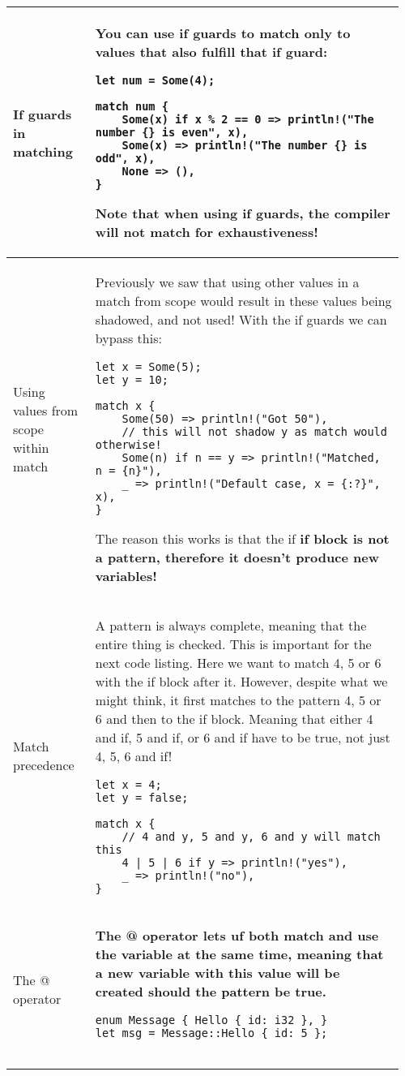 \documentclass[main.tex,fontsize=8pt,paper=a4,paper=portrait,DIV=calc,]{scrartcl}
\begin{document}
\begin{table}[ht!]
\begin{tabular}{|m{0.2\linewidth}|m{0.755\linewidth}|}
\hline
If guards in matching & 
You can use if guards to match only to values that also fulfill that if guard:\newline
\begin{lstlisting}
let num = Some(4);

match num {
    Some(x) if x % 2 == 0 => println!("The number {} is even", x),
    Some(x) => println!("The number {} is odd", x),
    None => (),
}
\end{lstlisting} 
\textcolor{OliveGreen}{Note that when using if guards, the compiler will not match for exhaustiveness!}\\
\hline
Using values from scope within match & 
Previously we saw that using other values in a match from scope would result in these values being shadowed, and not used!\newline
With the if guards we can bypass this:\newline
\begin{lstlisting}
let x = Some(5);
let y = 10;

match x {
    Some(50) => println!("Got 50"),
    // this will not shadow y as match would otherwise!
    Some(n) if n == y => println!("Matched, n = {n}"),
    _ => println!("Default case, x = {:?}", x),
}
\end{lstlisting} 
\textcolor{OliveGreen}{The reason this works is that the if \textbf{if block is not a pattern, therefore it doesn't produce new variables!}}\\
\hline
Match precedence & 
A pattern is always complete, meaning that the entire thing is checked.\newline
This is important for the next code listing. Here we want to match 4, 5 or 6 with the if block after it.\newline
However, despite what we might think, it first matches to the pattern 4, 5 or 6 and then to the if block.\newline
Meaning that either 4 and if, 5 and if, or 6 and if have to be true, not just 4, 5, 6 and if!\newline
\begin{lstlisting}
let x = 4;
let y = false;

match x {
    // 4 and y, 5 and y, 6 and y will match this
    4 | 5 | 6 if y => println!("yes"),
    _ => println!("no"),
}
\end{lstlisting}\\
\hline
The @ operator &
\textbf{The @ operator lets uf both match and use the variable at the same time, meaning that a new variable with this value will be created should the pattern be true.}\newline
\begin{lstlisting}
enum Message { Hello { id: i32 }, }
let msg = Message::Hello { id: 5 };


\end{lstlisting}
\end{tabular}
\end{table}
\end{document}

